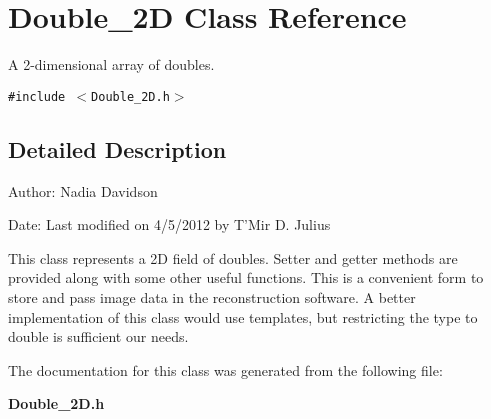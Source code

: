 \section{Double\_\-2D Class Reference}
\label{classDouble__2D}
A 2-dimensional array of doubles.  


{\tt \#include $<$Double\_\-2D.h$>$}



\subsection{Detailed Description}
\begin{Desc}
\item[Author:]Nadia Davidson \end{Desc}
\begin{Desc}
\item[Date:]Last modified on 4/5/2012 by T'Mir D. Julius\end{Desc}
This class represents a 2D field of doubles. Setter and getter methods are provided along with some other useful functions. This is a convenient form to store and pass image data in the reconstruction software. A better implementation of this class would use templates, but restricting the type to double is sufficient our needs. 



The documentation for this class was generated from the following file:\begin{CompactItemize}
\item 
\bf{Double\_\-2D.h}\end{CompactItemize}
